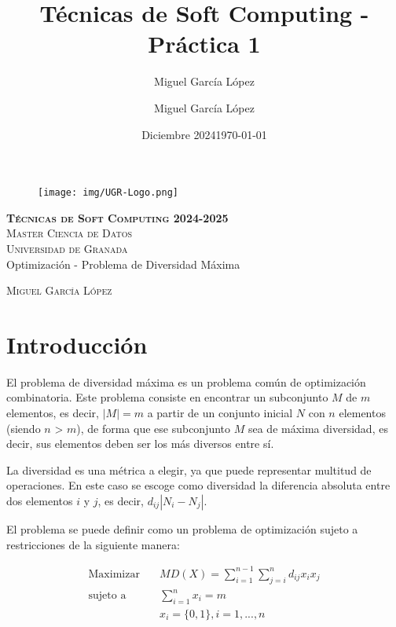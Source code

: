 \documentclass[12pt,letterpaper]{article}
\title{Técnicas de Soft Computing - Práctica 1}
\author{Miguel García López}
\date{Diciembre 2024}
\author{Miguel García López} %
\date{\normalsize\today} %
\begin{document}
\begin{titlepage}
\begin{figure}
    \vspace{-1.3cm}
    \begin{center}
        \texttt{[image: img/UGR-Logo.png]}
    \end{center}
\end{figure}
\vspace{1.3cm}
\centering
\normalfont \normalsize
\textsc{\textbf{Técnicas de Soft Computing 2024-2025} \\ \vspace{.15cm} Master Ciencia de Datos\\ \vspace{.15cm} Universidad de Granada} \\ [25pt] 
    \huge Optimización - Problema de Diversidad Máxima

\normalfont \normalsize \vspace{.30cm}
\textsc{Miguel García López}

\end{titlepage}

\tableofcontents
\listoffigures
\listoftables
\newpage

\section{Introducción}
El problema de diversidad máxima es un problema común de optimización combinatoria. Este problema consiste en encontrar un subconjunto $M$ de $m$ elementos, es decir, $|M| = m$ a partir de un conjunto inicial $N$ con $n$ elementos (siendo $n$ > $m$), de forma que ese subconjunto $M$ sea de máxima diversidad, es decir, sus elementos deben ser los más diversos entre sí.

La diversidad es una métrica a elegir, ya que puede representar multitud de operaciones. En este caso se escoge como diversidad la diferencia absoluta entre dos elementos $i$ y $j$, es decir, $d_{ij}|N_i-N_j|$.

El problema se puede definir como un problema de optimización sujeto a restricciones de la siguiente manera:

\begin{equation}
    \begin{aligned}
        \text{Maximizar}\quad & MD(X)=\sum_{i=1}^{n-1}\sum_{j=i}^n d_{ij}x_ix_j \\
        \text{sujeto a}\quad & \sum_{i=1}^nx_i=m \\
        & x_i=\{0,1\}, i=1,...,n
    \end{aligned}
\end{equation}
\end{document}
